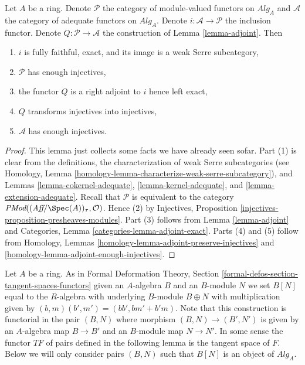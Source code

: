 \begin{lemma}
\label{lemma-enough-injectives}
Let $A$ be a ring. Denote $\mathcal{P}$ the category of module-valued
functors on $\textit{Alg}_A$ and $\mathcal{A}$ the category of adequate
functors on $\textit{Alg}_A$. Denote $i : \mathcal{A} \to \mathcal{P}$
the inclusion functor. Denote $Q : \mathcal{P} \to \mathcal{A}$
the construction of Lemma \ref{lemma-adjoint}.
Then
\begin{enumerate}
\item $i$ is fully faithful, exact, and its image is a weak Serre subcategory,
\item $\mathcal{P}$ has enough injectives,
\item the functor $Q$ is a right adjoint to $i$ hence left exact,
\item $Q$ transforms injectives into injectives,
\item $\mathcal{A}$ has enough injectives.
\end{enumerate}
\end{lemma}

\begin{proof}
This lemma just collects some facts we have already seen sofar.
Part (1) is clear from the definitions, the characterization of
weak Serre subcategories (see
Homology, Lemma \ref{homology-lemma-characterize-weak-serre-subcategory}),
and
Lemmas \ref{lemma-cokernel-adequate}, \ref{lemma-kernel-adequate},
and \ref{lemma-extension-adequate}.
Recall that $\mathcal{P}$ is equivalent to the category
$\textit{PMod}((\textit{Aff}/\Spec(A))_\tau, \mathcal{O})$.
Hence (2) by
Injectives, Proposition \ref{injectives-proposition-presheaves-modules}.
Part (3) follows from
Lemma \ref{lemma-adjoint}
and
Categories, Lemma \ref{categories-lemma-adjoint-exact}.
Parts (4) and (5) follow from
Homology, Lemmas \ref{homology-lemma-adjoint-preserve-injectives} and
\ref{homology-lemma-adjoint-enough-injectives}.
\end{proof}

\noindent
Let $A$ be a ring. As in
Formal Deformation Theory, Section
\ref{formal-defos-section-tangent-spaces-functors}
given an $A$-algebra $B$ and an $B$-module $N$ we set $B[N]$ equal to
the $R$-algebra with underlying $B$-module $B \oplus N$ with multiplication
given by $(b, m)(b', m ') = (bb', bm' + b'm)$. Note that this construction
is functorial in the pair $(B, N)$ where morphism $(B, N) \to (B', N')$
is given by an $A$-algebra map $B \to B'$ and an $B$-module map
$N \to N'$. In some sense the functor $TF$ of pairs defined in the following
lemma is the tangent space of $F$.
Below we will only consider pairs $(B, N)$ such that
$B[N]$ is an object of $\textit{Alg}_A$.

